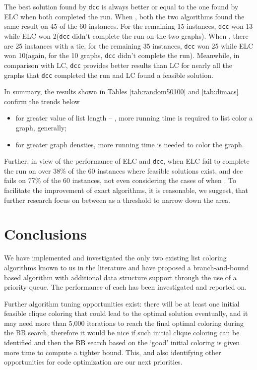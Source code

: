 \documentclass[10pt]{article}
\begin{document}
The best solution found by \texttt{dcc} is always better or equal to the one found by ELC when both completed the run.
When , both the two algorithms found the same result  on 45 of the 60 instances. For the remaining 15 instances, \texttt{dcc} won 13 while ELC won 2(\texttt{dcc}
didn't complete the run on the two graphs). When , there are 25 instances with a tie, for the remaining 35 instances, \texttt{dcc} won 25 while ELC won 10(again, for the 10 graphs, \texttt{dcc} didn't complete the run). Meanwhile, in comparison with LC, \texttt{dcc} provides better results than LC for nearly all the graphs that \texttt{dcc} completed the run and LC found a feasible solution.  

In summary, the results shown in Tables \ref{tab:random50100} and \ref{tab:dimacs} confirm the trends below
\begin{itemize}
\item for greater value of list length -- , more running time is
required to list color a graph, generally; 
\item for greater graph densties, more running time is needed
  to color the graph.
\end{itemize}

Further, in view of the performance of ELC and \texttt{dcc},  when  ELC fail to complete the run on over 38\% of the 60 instances where feasible solutions exist, and dcc fails on 77\% of the 60 instances, not even considering the cases of when .  To facilitate the improvement of exact
algorithms, it is reasonable, we suggest, that further research focus on
 between  as a threshold to narrow down the area.
 
\section{Conclusions}\label{sec:concls} 

We have implemented and investigated the only two existing list coloring
algorithms known to us in the literature and have proposed a
branch-and-bound based algorithm with additional data structure support
through the use of a priority queue. The performance of each has been
investigated and reported on.

Further algorithm tuning opportunities exist: there will be at least one initial feasible clique coloring
that could lead to the optimal solution eventually, and it may need more than 5,000 iterations
to reach the final optimal coloring during the BB search, therefore it would be nice if such 
initial clique coloring can be identified and then the BB search based on the `good' initial coloring is 
given more time to compute a tighter bound. This, and also identifying other opportunities for 
code optimization are our next priorities.
\end{document}

